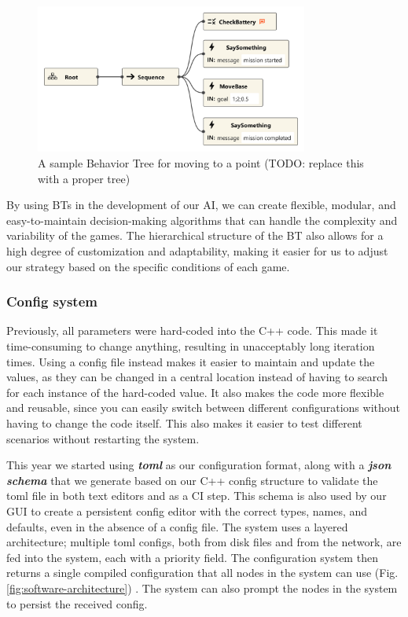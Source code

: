 \documentclass[runningheads]{llncs}
\begin{document}
\begin{figure}
	\centering
	\includegraphics[width=0.8\textwidth]{images/bt-move.png}
	\caption{A sample Behavior Tree for moving to a point (TODO: replace this with a proper tree)}
	\label{fig:bt-move}
\end{figure}

By using BTs in the development of our AI, we can create flexible, modular, and easy-to-maintain decision-making algorithms that can handle the complexity and variability of the games. The hierarchical structure of the BT also allows for a high degree of customization and adaptability, making it easier for us to adjust our strategy based on the specific conditions of each game.

\subsubsection{Config system}
Previously, all parameters were hard-coded into the C++ code. This made it time-consuming to change anything, resulting in unacceptably long iteration times. Using a config file instead makes it easier to maintain and update the values, as they can be changed in a central location instead of having to search for each instance of the hard-coded value. It also makes the code more flexible and reusable, since you can easily switch between different configurations without having to change the code itself. This also makes it easier to test different scenarios without restarting the system.

This year we started using \textbf{\textit{toml}} \cite{ref_toml} as our configuration format, along with a \textbf{\textit{json schema}} \cite{ref_json-schema} that we generate based on our C++ config structure to validate the toml file in both text editors and as a CI step. This schema is also used by our GUI to create a persistent config editor with the correct types, names, and defaults, even in the absence of a config file. The system uses a layered architecture; multiple toml configs, both from disk files and from the network, are fed into the system, each with a priority field. The configuration system then returns a single compiled configuration that all nodes in the system can use (Fig. \ref{fig:software-architecture}) . The system can also prompt the nodes in the system to persist the received config.
\end{document}
